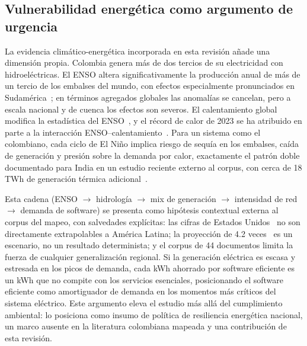\documentclass[conference]{IEEEtran}
\begin{document}
\subsection{Vulnerabilidad energ\'etica como argumento de urgencia}\label{sec:enso}
La evidencia clim\'atico-energ\'etica incorporada en esta revisi\'on añade una dimensi\'on propia. Colombia genera m\'as de dos tercios de su electricidad con hidroel\'ectricas. El ENSO altera significativamente la producci\'on anual de m\'as de un tercio de los embalses del mundo, con efectos especialmente pronunciados en Sudam\'erica~\cite{ng2017}; en t\'erminos agregados globales las anomal\'ias se cancelan, pero a escala nacional y de cuenca los efectos son severos. El calentamiento global modifica la estad\'istica del ENSO~\cite{latif2009}, y el r\'ecord de calor de 2023 se ha atribuido en parte a la interacci\'on ENSO--calentamiento~\cite{jiang2025,wmo2024,karnauskas2025}. Para un sistema como el colombiano, cada ciclo de El Niño implica riesgo de sequ\'ia en los embalses, ca\'ida de generaci\'on y presi\'on sobre la demanda por calor, exactamente el patr\'on doble documentado para India en un estudio reciente externo al corpus, con cerca de 18\,TWh de generaci\'on t\'ermica adicional~\cite{crea2026}.

Esta cadena (ENSO $\rightarrow$ hidrolog\'ia $\rightarrow$ mix de generaci\'on $\rightarrow$ intensidad de red $\rightarrow$ demanda de software) se presenta como hip\'otesis contextual externa al corpus del mapeo, con salvedades expl\'icitas: las cifras de Estados Unidos~\cite{siddik2021} no son directamente extrapolables a Am\'erica Latina; la proyecci\'on de 4.2 veces~\cite{maji2025} es un escenario, no un resultado determinista; y el corpus de 44 documentos limita la fuerza de cualquier generalizaci\'on regional. Si la generaci\'on el\'ectrica es escasa y estresada en los picos de demanda, cada kWh ahorrado por software eficiente es un kWh que no compite con los servicios esenciales, posicionando el software eficiente como amortiguador de demanda en los momentos m\'as cr\'iticos del sistema el\'ectrico. Este argumento eleva el estudio m\'as all\'a del cumplimiento ambiental: lo posiciona como insumo de pol\'itica de resiliencia energ\'etica nacional, un marco ausente en la literatura colombiana mapeada y una contribuci\'on de esta revisi\'on.
\end{document}

